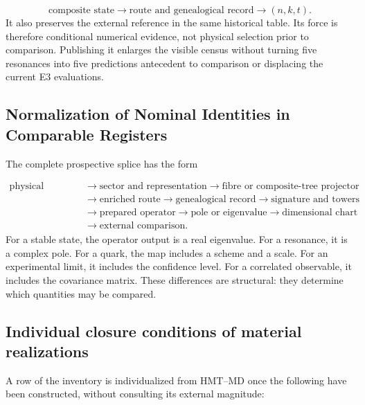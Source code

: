 \[
\text{composite state}
\longrightarrow\text{route and genealogical record}
\longrightarrow(n,k,t).
\]
It also preserves the external reference in the same historical table. Its force is therefore conditional numerical evidence, not physical selection prior to comparison. Publishing it enlarges the visible census without turning five resonances into five predictions antecedent to comparison or displacing the current E3 evaluations.
\fi

\subsection{Normalization of Nominal Identities in Comparable Registers}
The complete prospective splice has the form

\[
\begin{aligned}
\text{physical identity}
&\longrightarrow
\text{sector and representation}
\longrightarrow
\text{fibre or composite-tree projector}\\
&\longrightarrow
\text{enriched route}
\longrightarrow
\text{genealogical record}
\longrightarrow
\text{signature and towers}\\
&\longrightarrow
\text{prepared operator}
\longrightarrow
\text{pole or eigenvalue}
\longrightarrow
\text{dimensional chart}\\
&\longrightarrow
\text{external comparison}.
\end{aligned}
\]
For a stable state, the operator output is a real eigenvalue. For a resonance, it is a complex pole. For a quark, the map includes a scheme and a scale. For an experimental limit, it includes the confidence level. For a correlated observable, it includes the covariance matrix. These differences are structural: they determine which quantities may be compared.

\subsection{Individual closure conditions of material realizations}
A row of the inventory is individualized from HMT--MD once the following have been constructed, without consulting its external magnitude:

